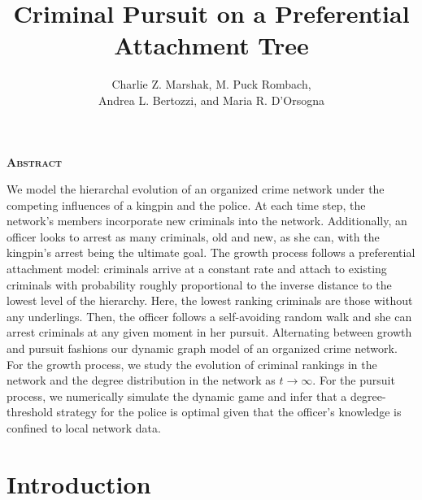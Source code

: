 \documentclass[11pt]{article}
\title{Criminal Pursuit on a Preferential Attachment Tree}
\author{Charlie Z. Marshak, M. Puck Rombach, \\Andrea L. Bertozzi, and Maria R. D'Orsogna}
\theoremstyle{plain}
\theoremstyle{definition}
\begin{document}
\maketitle
\begin{center}{\textbf{\textsc{Abstract}}}\end{center}
\begin{changemargin}{15mm}{15mm} 
\begin{small}
We model the hierarchal evolution of an organized crime network under the competing influences of a kingpin and the police.  At each time step, the network's members incorporate new criminals into the network.  Additionally, an officer looks to arrest as many criminals, old and new, as she can, with the kingpin's arrest being the ultimate goal.  The growth process follows a preferential attachment model: criminals arrive at a constant rate and attach to existing criminals with probability roughly proportional to the inverse distance to the lowest level of the hierarchy.  Here, the lowest ranking criminals are those without any underlings.  Then, the officer follows a self-avoiding random walk and she can arrest criminals at any given moment in her pursuit.  Alternating between growth and pursuit fashions our dynamic graph model of an organized crime network.  For the growth process, we study the evolution of criminal rankings in the network and the degree distribution in the network as $t \to \infty$.  For the pursuit process, we numerically simulate the dynamic game and infer that a degree-threshold strategy for the police is optimal given that the officer's knowledge is confined to local network data.
\end{small}

\end{changemargin}
\section*{Introduction}
\end{document}
